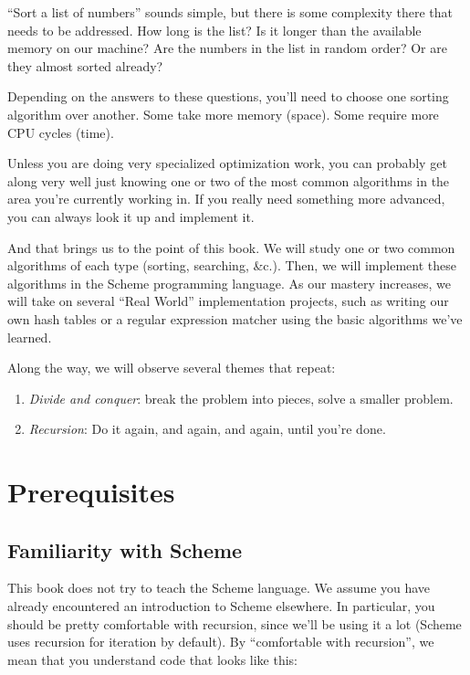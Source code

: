 \documentclass[12pt,openright,draft]{book}
\begin{document}
``Sort a list of numbers'' sounds simple, but there is some complexity
there that needs to be addressed.  How long is the list?  Is it longer
than the available memory on our machine?  Are the numbers in the list
in random order?  Or are they almost sorted already?

Depending on the answers to these questions, you'll need to choose one
sorting algorithm over another.  Some take more memory (space).  Some
require more CPU cycles (time).

Unless you are doing very specialized optimization work, you can
probably get along very well just knowing one or two of the most
common algorithms in the area you're currently working in.  If you
really need something more advanced, you can always look it up and
implement it.

And that brings us to the point of this book.  We will study one or
two common algorithms of each type (sorting, searching, &c.).  Then,
we will implement these algorithms in the Scheme programming language.
As our mastery increases, we will take on several ``Real World''
implementation projects, such as writing our own hash tables or a
regular expression matcher using the basic algorithms we've learned.

Along the way, we will observe several themes that repeat:

\begin{enumerate}
\item \emph{Divide and conquer}: break the problem into pieces, solve
  a smaller problem.
\item \emph{Recursion}: Do it again, and again, and again, until
  you're done.
\end{enumerate}

\chapter{Prerequisites}

\section{Familiarity with Scheme}

This book does not try to teach the Scheme language.  We assume you
have already encountered an introduction to Scheme elsewhere. In
particular, you should be pretty comfortable with recursion, since
we'll be using it a lot (Scheme uses recursion for iteration by
default).  By ``comfortable with recursion'', we mean that you
understand code that looks like this:
\end{document}
